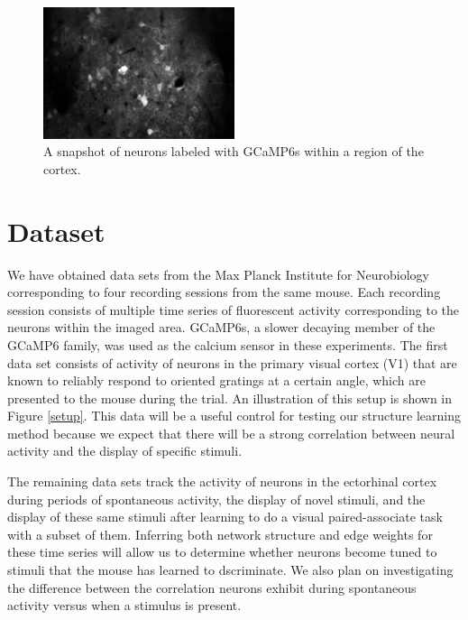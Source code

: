 \documentclass{article}
\begin{document}
\begin{figure}[h]
  \centering
  \includegraphics[width=0.5\textwidth]{neurons}
  \caption{A snapshot of neurons labeled with GCaMP6s within a region of the cortex.}
  \label{neurons}
\end{figure}

\section*{Dataset}

We have obtained data sets from the Max Planck Institute for Neurobiology 
corresponding to four recording sessions from the same mouse. Each recording 
session consists of multiple time series of fluorescent activity corresponding 
to the neurons within the imaged area. GCaMP6s, a slower decaying member of 
the GCaMP6 family, was used as the calcium sensor in these experiments. The 
first data set consists of activity of neurons in the primary visual cortex 
(V1) that are known to reliably respond to oriented gratings at a certain 
angle, which are presented to the mouse during the trial. An illustration of 
this setup is shown in Figure \ref{setup}. This data will be a useful control 
for testing our structure learning method because we expect that there will be 
a strong correlation between neural activity and the display of specific 
stimuli. \par

The remaining data sets track the activity of neurons in the ectorhinal cortex 
during periods of spontaneous activity, the display of novel stimuli, and the 
display of these same stimuli after learning to do a visual paired-associate 
task with a subset of them. Inferring both network structure and edge weights 
for these time series will allow us to determine whether neurons become tuned 
to stimuli that the mouse has learned to dscriminate. We also plan on 
investigating the difference between the correlation neurons exhibit during 
spontaneous activity versus when a stimulus is present. \par
\end{document}
